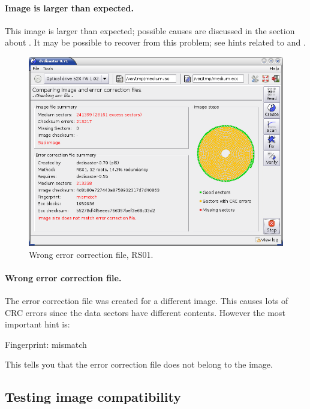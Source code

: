\paragraph{Image is larger than expected.} This image is larger than
expected; possible causes are discussed in the section
about . It may
be possible to recover from this problem; see hints
related to  and
. 

\newpage

\begin{figure}[h]
\centerline{\includegraphics[width=\textwidth]{screenshots/info-mismatch.png}}
\caption{Wrong error correction file, RS01.}
\label{howto-info-mismatch}
\end{figure}


\paragraph{Wrong error correction file.} The error correction
file was created for a different image.
This causes lots of CRC errors since the data sectors have different
contents. However the most important hint is:

\medskip

Fingerprint: \textcolor{dkred}{mismatch}

\medskip

This tells you that the error correction file does not belong to the image. 

\newpage
\subsection{Testing image compatibility}
\label{howto-compat-overview}

